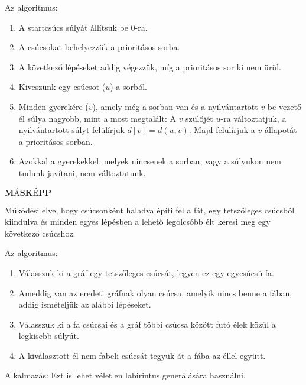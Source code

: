 \documentclass[margin=0px]{article}
\begin{document}
\begin{description}
	Az algoritmus:
	\begin{enumerate}
	    \item A startcsúcs súlyát állítsuk be 0-ra.
	    \item A csúcsokat behelyezzük a prioritásos sorba.
	    \item A következő lépéseket addig végezzük, míg a prioritásos sor ki nem ürül.
	    \item Kiveszünk egy csúcsot ($u$) a sorból.
	    \item Minden gyerekére ($v$), amely még a sorban van és a nyilvántartott $v$-be vezető él súlya nagyobb, mint a most megtalált: A $v$ szülőjét $u$-ra változtatjuk, a nyilvántartott súlyt felülírjuk $d[v] = d(u,v)$. Majd felülírjuk a $v$ állapotát a prioritásos sorban.
	    \item Azokkal a gyerekekkel, melyek nincsenek a sorban, vagy a súlyukon nem tudunk javítani, nem változtatunk.
	\end{enumerate}

$\textbf{MÁSKÉPP}$

Működési elve, hogy csúcsonként haladva építi fel a fát, egy tetszőleges csúcsból kiindulva és minden egyes lépésben a lehető legolcsóbb élt keresi meg egy következő csúcshoz.

	  Az algoritmus:
	  \begin{enumerate}
		\item Válasszuk ki a gráf egy tetszőleges csúcsát, legyen ez egy egycsúcsú fa.
		\item Ameddig van az eredeti gráfnak olyan csúcsa, amelyik nincs benne a fában, addig ismételjük az alábbi lépéseket.
		\item Válasszuk ki a fa csúcsai és a gráf többi csúcsa között futó élek közül a legkisebb súlyút.
		\item A kiválasztott él nem fabeli csúcsát tegyük át a fába az éllel együtt.
	  \end{enumerate}
	  Alkalmazás: Ezt is lehet véletlen labirintus generálására használni.
\end{description}
\end{document}

